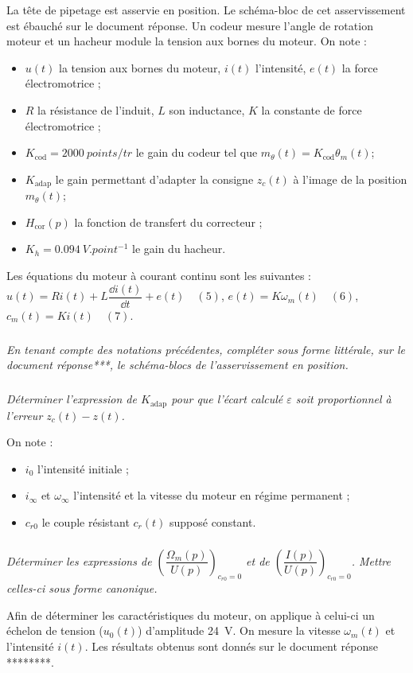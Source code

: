 \documentclass[10pt,fleqn]{article} %
\begin{document}
\begin{multicols}{2}
La tête de pipetage est asservie en position. Le schéma-bloc de cet asservissement est ébauché sur le
document réponse. Un codeur mesure l’angle de rotation moteur et un hacheur
module la tension aux bornes du moteur.
On note :
\begin{itemize}
\item $u(t)$ la tension aux bornes du moteur, $i(t)$ l’intensité, $e(t)$ la force électromotrice ;
\item $R$ la résistance de l’induit, $L$ son inductance, $K$ la constante de force électromotrice ;
\item $K_{\text{cod}} = \SI{2 000}{points/tr}$ le gain du codeur tel que $m_{\theta}(t) = K_{\text{cod}}\theta_m(t)$;
\item $K_\text{adap}$ le gain permettant d’adapter la consigne $z_c(t)$ à l’image de la position $m_{\theta}(t)$;
\item $H_{\text{cor}}(p)$ la fonction de transfert du correcteur ;
\item $K_h =\SI{0,094}{V.point^{-1}}$ le gain du hacheur.
\end{itemize}
Les équations du moteur à courant continu sont les suivantes :
$u(t) =Ri(t) + L\dfrac{\dd i(t)}{\dd t}+e(t) \quad (5)$, $e(t)=K\omega_m(t) \quad (6)$, $ c_m(t)=Ki(t)  \quad (7) $.

\subparagraph{}\textit{En tenant compte des notations précédentes, compléter sous forme littérale,
sur le document réponse***, le schéma-blocs de l’asservissement en position.}




\subparagraph{}\textit{Déterminer l’expression de $K_{\text{adap}}$ pour que l’écart calculé $\varepsilon$  soit proportionnel à l’erreur $z_c(t)-z(t)$.}

On note :
\begin{itemize}
\item $i_0$ l’intensité initiale ;
\item $i_{\infty}$ et $\omega_{\infty}$ l’intensité et la vitesse du moteur en régime permanent ;
\item $c_{r0}$ le couple résistant $c_{r}(t)$ supposé constant.
\end{itemize}

\subparagraph{\label{26}}\textit{Déterminer les expressions de $\left(\dfrac{\Omega_m(p)}{U(p)}\right)_{c_{r0}=0}$ et de $\left(\dfrac{I(p)}{U(p)}\right)_{c_{r0}=0}$. Mettre celles-ci
sous forme canonique.}

Afin de déterminer les caractéristiques du moteur, on applique à celui-ci un échelon de tension
($u_0(t)$) d’amplitude \SI{24}{V}. On mesure la vitesse $\omega_m(t)$ et l’intensité $i(t)$. Les résultats obtenus sont donnés sur le document réponse ********.


\end{multicols}
\end{document}
